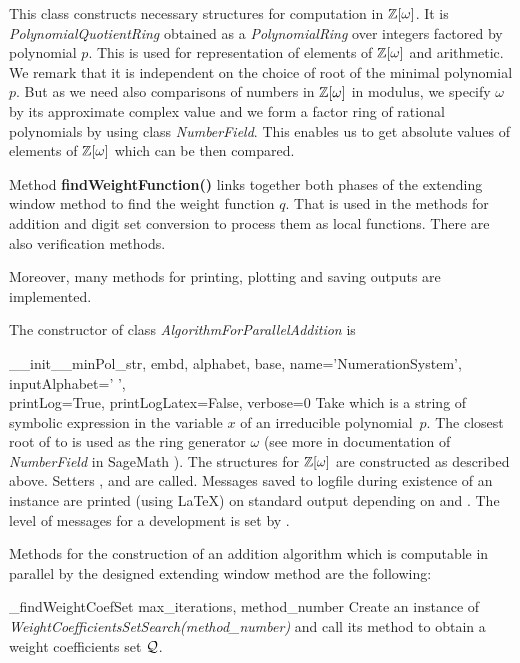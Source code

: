 This class constructs necessary structures for computation in $\mathbb{Z}[\omega]$. It is \emph{PolynomialQuotientRing} obtained as a \emph{PolynomialRing} over integers factored by polynomial $p$. This is used for representation of elements of $\mathbb{Z}[\omega]$ and arithmetic. We remark that it is independent on the choice of root of the  minimal polynomial $p$. But as we need also comparisons of numbers in $\mathbb{Z}[\omega]$ in modulus, we specify $\omega$ by its approximate complex value and we form a factor ring of rational polynomials by using class \emph{NumberField}. This enables us to get absolute values of elements of $\mathbb{Z}[\omega]$ which can be then compared.

Method \textbf{findWeightFunction()} links together both phases of the extending window method to find the weight function $q$. That is used in the methods for addition and digit set conversion to process them as local functions. There are also verification methods.

Moreover, many methods for printing, plotting and saving outputs are implemented.

The constructor of class \emph{AlgorithmForParallelAddition} is 

\begin{method}{\_\_init\_\_}{minPol\_str, embd, alphabet, base, name='NumerationSystem', inputAlphabet=' ',\\
 printLog=True, printLogLatex=False, verbose=0}
Take  which is a string of symbolic expression in the variable $x$ of an irreducible polynomial~$p$. The closest root of   to  is used as the ring generator $\omega$ (see more in documentation of \emph{NumberField} in SageMath \cite{sage}). The structures for $\mathbb{Z}[\omega]$ are constructed as described above. Setters ,  and  are called.  Messages saved to logfile during existence of an instance are printed (using \LaTeX) on standard output depending on  and . The level of messages for a development is set by . 
\end{method}

Methods for the construction of an addition algorithm which is computable in parallel by the designed extending window method are the following:

\begin{method}{\_findWeightCoefSet}{ max\_iterations, method\_number}
Create an instance of \emph{WeightCoefficientsSetSearch(method\_number)} and call its method  to obtain a weight coefficients set $\mathcal{Q}$.
\end{method}

